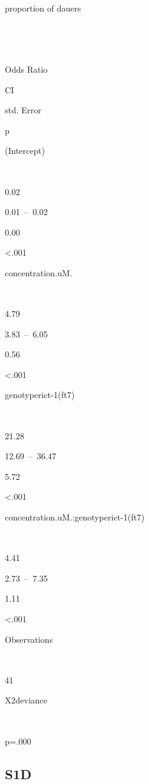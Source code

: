 \documentclass[]{article}
\begin{document}
~

~

proportion of dauers

~

~

Odds Ratio

CI

std. Error

p

(Intercept)

~

0.02

0.01~--~0.02

0.00

\textless{}.001

concentration.uM.

~

4.79

3.83~--~6.05

0.56

\textless{}.001

genotyperict-1(ft7)

~

21.28

12.69~--~36.47

5.72

\textless{}.001

concentration.uM.:genotyperict-1(ft7)

~

4.41

2.73~--~7.35

1.11

\textless{}.001

Observations

~

41

Χ2deviance

~

p=.000

\subsection{S1D}\label{s1d}
\end{document}

